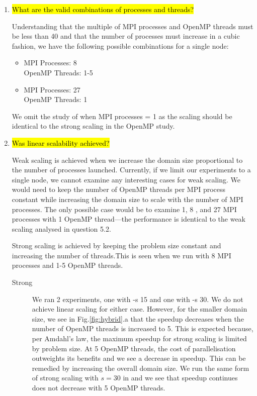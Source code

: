 \documentclass{article}
\begin{document}
\begin{enumerate}
	\item \hl{What are the valid combinations of processes and threads?}

	Understanding that the multiple of MPI processes and OpenMP threads must be less than 40 and that the number of processes must increase in a cubic fashion, we have the following possible combinations for a single node:
	\begin{itemize}
		\item   MPI Processes: 8\\
				OpenMP Threads: 1-5
		\item	MPI Processes: 27\\
				OpenMP Threads: 1
	\end{itemize}
	
	We omit the study of when MPI processes = 1 as the scaling should be identical to the strong scaling in the OpenMP study.
	
	\item \hl{Was linear scalability achieved?}
	
	Weak scaling is achieved when we increase the domain size proportional to the number of processes launched. Currently, if we limit our experiments to a single node, we cannot examine any interesting cases for weak scaling. We would need to keep the number of OpenMP threads per MPI process constant while increasing the domain size to scale with the number of MPI processes. The only possible case would be to examine 1, 8 , and 27 MPI processes with 1 OpenMP thread---the performance is identical to the weak scaling analysed in question 5.2.
	
	Strong scaling is achieved by keeping the problem size constant and increasing the number of threads.This is seen when we run with 8 MPI processes and 1-5 OpenMP threads. 
	
	\begin{description}
		\item[Strong] We ran 2 experiments, one with -s 15 and one with -s 30. We do not achieve linear scaling for either case. However, for the smaller domain size, we see in Fig.\ref{fig:hybrid}.a that the speedup decreases when the number of OpenMP threads is increased to 5. This is expected because, per Amdahl's law, the maximum speedup for strong scaling is limited by problem size. At 5 OpenMP threads, the cost of parallelisation outweights its benefits and we see a decrease in speedup. This can be remedied by increasing the overall domain size. We run the same form of strong scaling with $s=30$ in and we see that speedup continues does not decrease with 5 OpenMP threads.
	\end{description}
		

\end{enumerate}
\end{document}
